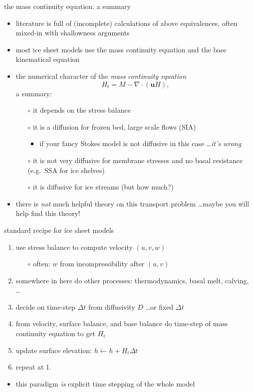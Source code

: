 \begin{frame}{the mass continuity equation: a summary}

\begin{itemize}
\item literature is full of (incomplete) calculations of above equivalences, often mixed-in with shallowness arguments
\item most ice sheet models use the mass continuity equation and the base kinematical equation

\bigskip
\item the numerical character of the \emph{mass continuity equation}
  $$H_t = M - \nabla \cdot (\mathbf{u} H),$$
a summary:
  \begin{itemize}
  \item[$\circ$] it depends on the stress balance
  \item[$\circ$] it is a diffusion for frozen bed, large scale flows (SIA)
      \begin{itemize}
      \item if your fancy Stokes model is not diffusive in this case \dots \emph{it's wrong}
      \end{itemize}
  \item[$\circ$] it is not very diffusive for membrane stresses and no basal resistance (e.g.~SSA for ice shelves)
  \item[$\circ$] it is diffusive for ice streams (but how much?)
  \end{itemize}

\bigskip
\item there is \emph{not} much helpful theory on this transport problem \dots maybe you will help find this theory!
\end{itemize}
\end{frame}


\begin{frame}{standard recipe for ice sheet models}

\begin{enumerate}
  \item use stress balance to compute velocity $(u,v,w)$
      \begin{itemize}
      \item[$\circ$] often: $w$ from incompressibility after $(u,v)$
      \end{itemize}
  \item somewhere in here do other processes: thermodynamics, basal melt, calving, \dots
  \item decide on time-step $\Delta t$ from diffusivity $D$ \dots or fixed $\Delta t$
  \item from velocity, surface balance, and base balance do time-step of mass continuity equation to get $H_t$
  \item update surface elevation: $h \gets h+H_t \Delta t$
  \item repeat at 1.
\end{enumerate}

\bigskip
\begin{itemize}
\item this paradigm \emph{is} explicit time stepping of the whole model
\end{itemize}
\end{frame}
